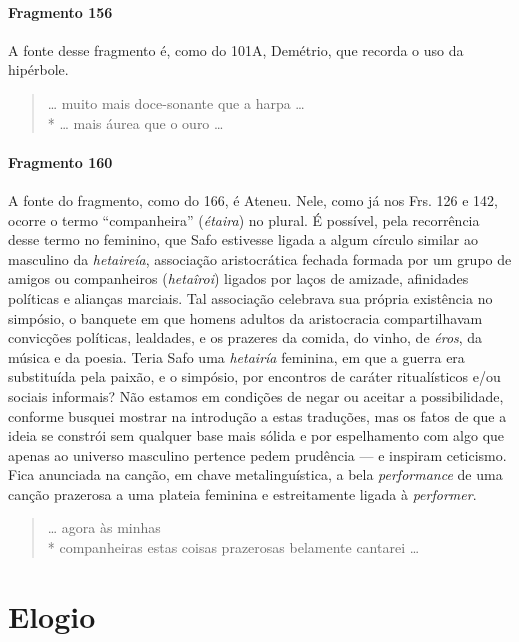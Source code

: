 \paragraph{Fragmento 156}

{\small A fonte desse fragmento é, como do 101A, Demétrio, que recorda o uso da
hipérbole.}

\begin{verse}
\ldots{} muito mais doce-sonante que a harpa \ldots{}\\*
\ldots{} mais áurea que o ouro \ldots{}
\end{verse}

\paragraph{Fragmento 160}

{\small A fonte do fragmento, como do 166, é Ateneu. Nele, como já nos Frs.
126 e 142, ocorre o termo ``companheira” (\textit{étaira}) no plural. É
possível, pela recorrência desse termo no feminino, que Safo estivesse ligada a
algum círculo similar ao masculino da \textit{hetaireía}, associação
aristocrática fechada formada por um grupo de amigos ou companheiros
(\textit{hetaîroi}) ligados por laços de amizade, afinidades políticas e
alianças marciais. Tal associação celebrava sua própria existência no simpósio,
o banquete em que homens adultos da aristocracia compartilhavam convicções
políticas, lealdades, e os prazeres da comida, do vinho, de \textit{éros}, da música e 
da poesia. Teria Safo uma \textit{hetairía }feminina, em que a guerra era substituída pela
paixão, e o simpósio, por encontros de caráter ritualísticos e/ou sociais
informais? Não estamos em condições de negar ou aceitar a possibilidade,
conforme busquei mostrar na introdução a estas traduções, mas os fatos de que a
ideia se constrói sem qualquer base mais sólida e por espelhamento com algo que
apenas ao universo masculino pertence pedem prudência --- e inspiram ceticismo.
Fica anunciada na canção, em chave metalinguística, a bela \textit{performance}
de uma canção prazerosa a uma plateia feminina e estreitamente ligada à
\textit{performer}.}

\begin{verse}
\ldots{} agora às minhas\\*
companheiras estas coisas prazerosas \qb{}belamente cantarei \ldots{}
\end{verse}


\section{Elogio}

